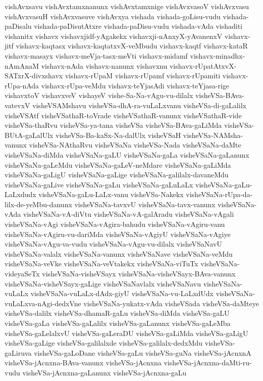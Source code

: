 {vishAvxsavu
vishAvxtamxnanunx
vishAvxtamxnige
vishAvxvasoV
vishAvxvasu
vishAvxvasuH
vishAvxvasuve
vishAvxya
vishada
vishada-goLisu-vudu
vishada-paDisalu
vishada-paDisutAtxre
vishada-paDisu-vudu
vishada-vAda
vishaditi
vishanitx
vishavx
vishavxjidf-yAgakekx
vishavxji-nAnxyX-yAvanenxV
vishavx-jitf
vishavx-kaqtasx
vishavx-kaqtatxvX-veMbudu
vishavx-kaqtf
vishavx-kataR
vishavx-masayx
vishavx-meVja-tasx-meVti
vishavx-midamf
vishavx-minadhx-nAmAnaM
vishavx-nAda
vishavx-nanunx
vishavxnu
vishavx-rUpatAtxvX-SATxrX-divxshavx
vishavx-rUpaM
vishavx-rUpamf
vishavx-rUpamiti
vishavx-rUpa-nAda
vishavx-rUpa-veMdu
vishavx-teYjasAdi
vishavx-teYjasa-rige
vishavxtoV
vishavxveV
vishayeV
vishe-Sa-Na-vAgu-vu-dilalx
visheVSa-BAva-vatevxV
visheVSAMshavu
visheVSa-dhA-ra-vuLaLxvanu
visheVSa-di-gaLalilx
visheVSAtf
visheVSathaR-toVrade
visheVSathaR-vanunx
visheVSathaR-vide
visheVSa-thaRvu
visheVSa-ya-tana
visheVSa
visheVSa-BAva-gaLiMda
visheVSa-BUtA-gaLalUlx
visheVSa-Ba-kaSx-Na-dalUlx
visheVSaH
visheVSa-NAMsha-vanunx
visheVSa-NAthaRvu
visheVSaNa
visheVSa-Nada
visheVSaNa-daMte
visheVSaNa-diMda
visheVSaNa-gaLU
visheVSaNa-gaLa
visheVSaNa-gaLanunx
visheVSaNa-gaLeMdu
visheVSaNa-gaLeV-neMdare
visheVSaNa-gaLiMda
visheVSaNa-gaLigU
visheVSaNa-gaLige
visheVSaNa-galilalx-davaneMdu
visheVSaNa-gaLive
visheVSaNa-gaLu
visheVSaNa-gaLuLaLx
visheVSaNa-gaLu-LaLxdudx
visheVSaNa-gaLu-LaLx-vanu
visheVSa-Nakekx
visheVSaNa-rUpa-da-lilx-de-yeMbu-danunx
visheVSaNa-tavxvU
visheVSaNa-tavx-vanunx
visheVSaNa-vAda
visheVSaNa-vA-diVtu
visheVSaNa-vA-galAradu
visheVSaNa-vAgali
visheVSaNa-vAgi
visheVSaNa-vAgira-bahudu
visheVSaNa-vAgiru-vanu
visheVSaNa-vAgiru-vu-dariMda
visheVSaNa-vAgiyU
visheVSaNa-vAgiye
visheVSaNa-vAgu-va-vudu
visheVSaNa-vAgu-vu-dilalx
visheVSaNavU
visheVSaNa-valalx
visheVSaNa-vanunx
visheVSaNave
visheVSaNa-veMdu
visheVSaNa-veVke
visheVSaNa-veVtakekx
visheVSaNa-viTuTx
visheVSaNa-videyaSeTx
visheVSaNa-visheVSayx
visheVSaNa-visheVSayx-BAva-vanunx
visheVSaNa-visheVSayx-gaLige
visheVSaNavlalx
visheVSaNavu
visheVSaNa-vuLaLx
visheVSaNa-vuLaLx-dAdx-giyU
visheVSaNa-vu-LaLxdUdx
visheVSaNa-vuLaLxva-nAgi-dedxVne
visheVSaNa-yukatx-vAda
visheVSada
visheVSa-daMteye
visheVSa-dalilx
visheVSa-dhamaR-gaLu
visheVSa-diMda
visheVSa-gaLU
visheVSa-gaLa
visheVSa-gaLalilx
visheVSa-gaLanunx
visheVSa-gaLeMba
visheVSa-gaLelalxvU
visheVSa-gaLeraDU
visheVSa-gaLiMda
visheVSa-gaLigU
visheVSa-gaLige
visheVSa-galilalxde
visheVSa-galilalx-dedxMdu
visheVSa-gaLiruva
visheVSa-gaLoDane
visheVSa-gaLu
visheVSa-guNa
visheVSa-jAcnxnA
visheVSa-jAcnxna-BAva-vanunx
visheVSa-jAcnxna
visheVSa-jAcnxna-daMti-ru-vudu
visheVSa-jAcnxna-gaLanunx
visheVSa-jAcnxna-gaLu
}
